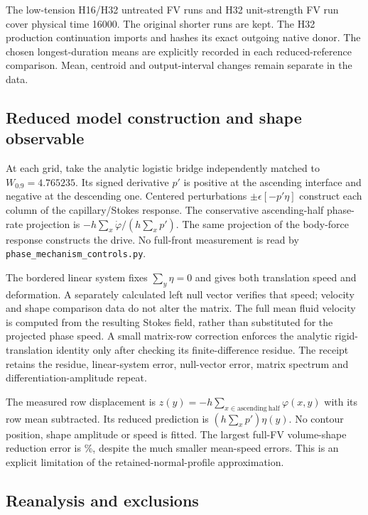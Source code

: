 The low-tension H16/H32 untreated FV runs and H32 unit-strength FV run
cover physical time 16000. The original shorter runs are kept.
The H32 production continuation imports and hashes its exact outgoing
native donor. The chosen longest-duration means are explicitly recorded
in each reduced-reference comparison.
Mean, centroid and output-interval changes remain separate in the data.

\subsection{Reduced model construction and shape observable}
At each grid, take the analytic logistic bridge independently matched to
$W_{0.9}=4.765235$. Its signed derivative $p'$ is positive at the ascending
interface and negative at the descending one.
Centered perturbations $\pm\epsilon[-p'\eta]$ construct each column of the
capillary/Stokes response. The conservative ascending-half phase-rate
projection is $-h\sum_x\dot\varphi/(h\sum_xp')$.
The same projection of the body-force response constructs the drive.
No full-front measurement is read by
\texttt{phase\_mechanism\_controls.py}.

The bordered linear system fixes $\sum_y\eta=0$ and gives both translation
speed and deformation. A separately calculated left null vector verifies
that speed; velocity and shape comparison data do not alter the matrix.
The full mean fluid velocity is computed from the resulting Stokes field,
rather than substituted for the projected phase speed.
A small matrix-row correction enforces the analytic rigid-translation
identity only after checking its finite-difference residue.
The receipt retains the residue, linear-system error, null-vector error,
matrix spectrum and differentiation-amplitude repeat.

The measured row displacement is
$z(y)=-h\sum_{x\in\mathrm{ascending\ half}}\varphi(x,y)$ with its row mean
subtracted. Its reduced prediction is $(h\sum_xp')\eta(y)$.
No contour position, shape amplitude or speed is fitted.
The largest full-FV volume-shape reduction error is
\MajorFVShapePercent\%, despite the much smaller mean-speed errors.
This is an explicit limitation of the retained-normal-profile approximation.

\subsection{Reanalysis and exclusions}
